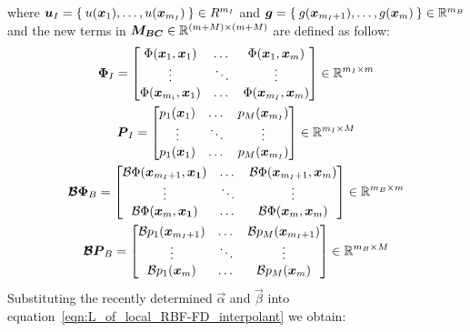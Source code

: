 where $\boldsymbol{u}_I = \Set{u(\boldsymbol{x}_1), \dots, u(\boldsymbol{x}_{m_I})} \in R^{m_I}$ and $\boldsymbol{g} = \Set{g(\boldsymbol{x}_{m_I+1}), \dots, g(\boldsymbol{x}_m)} \in \mathbb{R}^{m_B}$ and the new terms in $\boldsymbol{M_{BC}} \in \mathbb{R}^{(m+M) \times (m+M)}$ are defined as follow:
\begin{equation}
	\begin{gathered}
		\boldsymbol{\Phi}_I = \begin{bmatrix}
							\Phi(\boldsymbol{x}_1, \boldsymbol{x}_1)    	  &    \dots    & \Phi(\boldsymbol{x}_1, \boldsymbol{x}_m)  		\\
							\vdots						  	  &  \ddots		& \vdots					  		\\
							\Phi(\boldsymbol{x}_{m_i}, \boldsymbol{x}_1)    &    \dots    & \Phi(\boldsymbol{x}_{m_I}, \boldsymbol{x}_m)
					   \end{bmatrix} \in \mathbb{R}^{m_I \times m}  \\
		\boldsymbol{P}_I = \begin{bmatrix}
							p_1(\boldsymbol{x}_{1})	&  \dots  &  p_M(\boldsymbol{x}_{m_I})   \\
							\vdots				& \ddots  & \vdots					\\	
							p_1(\boldsymbol{x}_{1})	&  \dots  &  p_M(\boldsymbol{x}_{m_I})
					\end{bmatrix} \in \mathbb{R}^{m_I \times M}  \\
		\boldsymbol{\mathcal{B}\Phi}_B = \begin{bmatrix}
										\mathcal{B}\Phi(\boldsymbol{x}_{m_I+1}, \boldsymbol{x_1})  &  \dots  & \mathcal{B}\Phi(\boldsymbol{x}_{m_I+1}, \boldsymbol{x}_m)  \\
										\vdots										 & \ddots  & \vdots										  \\
										\mathcal{B}\Phi(\boldsymbol{x}_{m}, \boldsymbol{x_1})  	 &  \dots  & \mathcal{B}\Phi(\boldsymbol{x}_{m}, \boldsymbol{x}_m)
								  \end{bmatrix} \in \mathbb{R}^{m_B \times m}  \\
		\boldsymbol{\mathcal{B}P}_B = \begin{bmatrix}
									\mathcal{B}p_1(\boldsymbol{x}_{m_I+1})  &  \dots  & \mathcal{B}p_M(\boldsymbol{x}_{m_I+1})  \\
									\vdots							 & \ddots  & \vdots							  \\
									\mathcal{B}p_1(\boldsymbol{x}_{m})  	 &  \dots  & \mathcal{B}p_M(\boldsymbol{x}_{m})
							  \end{bmatrix} \in \mathbb{R}^{m_B \times M}
	\end{gathered}
\end{equation}
Substituting the recently determined $\vec{\alpha}$ and $\vec{\beta}$ into equation~\eqref{eqn:L_of_local_RBF-FD_interpolant} we obtain:
